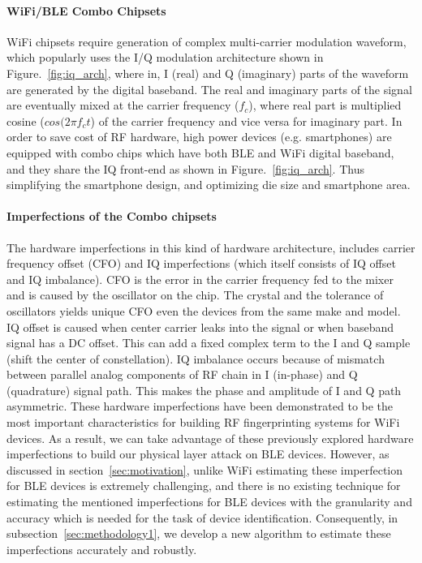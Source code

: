\paragraph{WiFi/BLE Combo Chipsets}
WiFi chipsets require generation of complex multi-carrier modulation waveform, which popularly uses the I/Q modulation architecture shown in Figure.~\ref{fig:iq_arch}, where in, I (real) and Q (imaginary) parts of the waveform are generated by the digital baseband. The real and imaginary parts of the signal are eventually mixed at the carrier frequency ($f_c$), where real part is multiplied cosine ($cos(2\pi f_c t$) of the carrier frequency and vice versa for imaginary part. In order to save cost of RF hardware, high power devices (e.g. smartphones) are equipped with combo chips which have both BLE and WiFi digital baseband, and they share the IQ front-end as shown in Figure.~\ref{fig:iq_arch}. Thus simplifying the smartphone design, and optimizing die size and smartphone area.

\paragraph{Imperfections of the Combo chipsets}

The hardware imperfections in this kind of hardware architecture, includes carrier frequency offset (CFO) and IQ imperfections (which itself consists of IQ offset and IQ imbalance). CFO is the error in the carrier frequency fed to the mixer and is caused by the oscillator on the chip. The crystal and the tolerance of oscillators yields unique CFO even the devices from the same make and model. 
IQ offset is caused when center carrier leaks into the signal or when baseband signal has a DC offset. This can add a fixed complex term to the I and Q sample (shift the center of constellation). IQ imbalance occurs because of mismatch between parallel analog components of RF chain in I (in-phase) and Q (quadrature) signal path. This makes the phase and amplitude of I and Q path asymmetric. These hardware imperfections have been demonstrated to be the most important characteristics for building RF fingerprinting systems for WiFi devices. As a result, we can take advantage of these previously explored hardware imperfections to build our physical layer attack on BLE devices. However, as discussed in section~\ref{sec:motivation}, unlike WiFi estimating these imperfection for BLE devices is extremely challenging, and there is no existing technique for estimating the mentioned imperfections for BLE devices with the granularity and accuracy which is needed for the task of device identification. Consequently, in subsection~\ref{sec:methodology1}, we develop a new algorithm to estimate these imperfections accurately and robustly.

